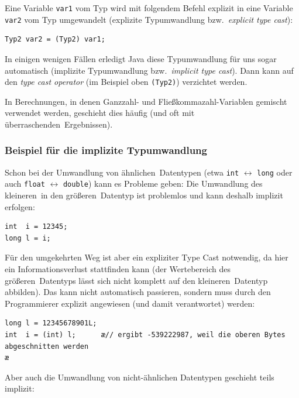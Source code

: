 Eine Variable \lstinline|var1| vom Typ  wird mit folgendem Befehl
explizit in eine Variable \lstinline|var2| vom Typ  umgewandelt
(explizite Typumwandlung bzw.\ \emph{explicit type cast}):

\begin{lstlisting}
Typ2 var2 = (Typ2) var1;
\end{lstlisting}

In einigen wenigen Fällen erledigt Java diese Typumwandlung für uns sogar
automatisch (implizite Typumwandlung bzw.\ \emph{implicit type cast}). Dann kann
auf den \emph{type cast operator} (im Beispiel oben \lstinline|(Typ2)|)
verzichtet werden.

In Berechnungen, in denen Ganzzahl- und Fließkommazahl-Variablen gemischt
verwendet werden, geschieht dies häufig (und oft mit \glqq überraschenden\grqq\
Ergebnissen).

\subsubsection{Beispiel für die implizite Typumwandlung}

Schon bei der Umwandlung von \glqq ähnlichen\grqq\ Datentypen
(etwa \lstinline|int| $\leftrightarrow$ \lstinline|long| oder auch
\lstinline|float| $\leftrightarrow$ \lstinline|double|) kann es Probleme geben:
Die Umwandlung des \glqq kleineren\grqq\ in den \glqq größeren\grqq\ Datentyp
ist problemlos und kann deshalb implizit erfolgen:

\begin{lstlisting}
int  i = 12345;
long l = i;
\end{lstlisting}

Für den umgekehrten Weg ist aber ein expliziter Type Cast notwendig, da hier ein
Informationsverlust stattfinden kann (der Wertebereich des \glqq größeren\grqq\
Datentyps lässt sich nicht komplett auf den \glqq kleineren\grqq\ Datentyp
abbilden). Das kann nicht automatisch passieren, sondern muss durch den
Programmierer explizit angewiesen (und damit verantwortet) werden:

\begin{lstlisting}
long l = 12345678901L;
int  i = (int) l;      æ// ergibt -539222987, weil die oberen Bytes abgeschnitten werden
æ\end{lstlisting}

\pagebreak

Aber auch die Umwandlung von nicht-ähnlichen Datentypen geschieht teils
implizit:

